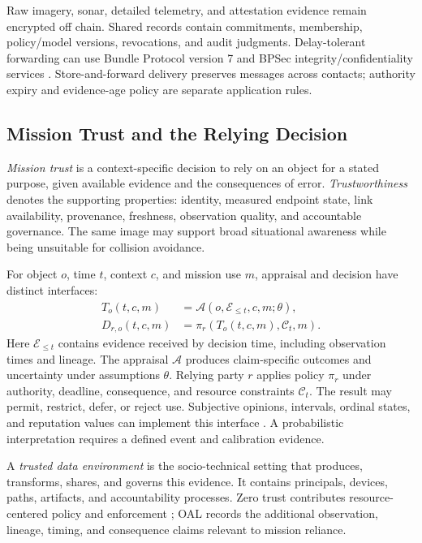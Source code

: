 Raw imagery, sonar, detailed telemetry, and attestation evidence remain encrypted off chain. Shared records contain commitments, membership, policy/model versions, revocations, and audit judgments. Delay-tolerant forwarding can use Bundle Protocol version 7 and BPSec integrity/confidentiality services \citep{rfc9171,rfc9172}. Store-and-forward delivery preserves messages across contacts; authority expiry and evidence-age policy are separate application rules.

\subsection{Mission Trust and the Relying Decision}

\emph{Mission trust} is a context-specific decision to rely on an object for a stated purpose, given available evidence and the consequences of error. \emph{Trustworthiness} denotes the supporting properties: identity, measured endpoint state, link availability, provenance, freshness, observation quality, and accountable governance. The same image may support broad situational awareness while being unsuitable for collision avoidance.

For object $o$, time $t$, context $c$, and mission use $m$, appraisal and decision have distinct interfaces:
\begin{equation}
\begin{aligned}
T_o(t,c,m)&=\mathcal{A}(o,\mathcal{E}_{\leq t},c,m;\theta),\\
D_{r,o}(t,c,m)&=\pi_r\!\left(T_o(t,c,m),\mathcal{C}_t,m\right).
\end{aligned}\label{eq:trust}
\end{equation}
Here $\mathcal{E}_{\leq t}$ contains evidence received by decision time, including observation times and lineage. The appraisal $\mathcal{A}$ produces claim-specific outcomes and uncertainty under assumptions $\theta$. Relying party $r$ applies policy $\pi_r$ under authority, deadline, consequence, and resource constraints $\mathcal{C}_t$. The result may permit, restrict, defer, or reject use. Subjective opinions, intervals, ordinal states, and reputation values can implement this interface \citep{jsang2016subjective,mui2003computational,kamvar2003eigentrust}. A probabilistic interpretation requires a defined event and calibration evidence.

A \emph{trusted data environment} is the socio-technical setting that produces, transforms, shares, and governs this evidence. It contains principals, devices, paths, artifacts, and accountability processes. Zero trust contributes resource-centered policy and enforcement \citep{rose2020zero}; OAL records the additional observation, lineage, timing, and consequence claims relevant to mission reliance.

